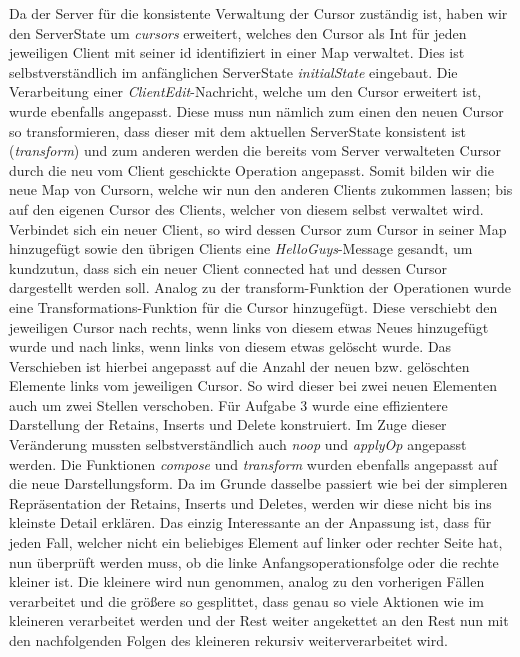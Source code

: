 \documentclass{rp}
\begin{document}
Da der Server für die konsistente Verwaltung der Cursor zuständig ist, haben wir den ServerState um \textit{cursors} erweitert, welches den Cursor als Int für jeden jeweiligen Client mit seiner id identifiziert in einer Map verwaltet. Dies ist selbstverständlich im anfänglichen ServerState \textit{initialState} eingebaut.
Die Verarbeitung einer \textit{ClientEdit}-Nachricht, welche um den Cursor erweitert ist, wurde ebenfalls angepasst. Diese muss nun nämlich zum einen den neuen Cursor so transformieren, dass dieser mit dem aktuellen ServerState konsistent ist (\textit{transform}) und zum anderen werden die bereits vom Server verwalteten Cursor durch die neu vom Client geschickte Operation angepasst. Somit bilden wir die neue Map von Cursorn, welche wir nun den anderen Clients zukommen lassen; bis auf den eigenen Cursor des Clients, welcher von diesem selbst verwaltet wird.
Verbindet sich ein neuer Client, so wird dessen Cursor zum Cursor in seiner Map hinzugefügt sowie den übrigen Clients eine \textit{HelloGuys}-Message gesandt, um kundzutun, dass sich ein neuer Client connected hat und dessen Cursor dargestellt werden soll.
Analog zu der transform-Funktion der Operationen wurde eine Transformations-Funktion für die Cursor hinzugefügt. Diese verschiebt den jeweiligen Cursor nach rechts, wenn links von diesem etwas Neues hinzugefügt wurde und nach links, wenn links von diesem etwas gelöscht wurde. Das Verschieben ist hierbei angepasst auf die Anzahl der neuen bzw. gelöschten Elemente links vom jeweiligen Cursor. So wird dieser bei zwei neuen Elementen auch um zwei Stellen verschoben.
Für Aufgabe 3 wurde eine effizientere Darstellung der Retains, Inserts und Delete konstruiert.
Im Zuge dieser Veränderung mussten selbstverständlich auch \textit{noop} und \textit{applyOp} angepasst werden.
Die Funktionen \textit{compose} und \textit{transform} wurden ebenfalls angepasst auf die neue Darstellungsform. Da im Grunde dasselbe passiert wie bei der simpleren Repräsentation der Retains, Inserts und Deletes, werden wir diese nicht bis ins kleinste Detail erklären. Das einzig Interessante an der Anpassung ist, dass für jeden Fall, welcher nicht ein beliebiges Element auf linker oder rechter Seite hat, nun überprüft werden muss, ob die linke Anfangsoperationsfolge oder die rechte kleiner ist. Die kleinere wird nun genommen, analog zu den vorherigen Fällen verarbeitet und die größere so gesplittet, dass genau so viele Aktionen wie im kleineren verarbeitet werden und der Rest weiter angekettet an den Rest nun mit den nachfolgenden Folgen des kleineren rekursiv weiterverarbeitet wird.
\end{document}
